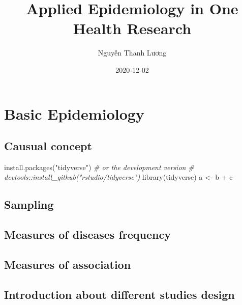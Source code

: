\documentclass[
]{article}
\title{Applied Epidemiology in One Health Research}
\author{Nguyễn Thanh Lương}
\date{2020-12-02}
\newenvironment{Shaded}{\begin{snugshade}}{\end{snugshade}}
\newcommand{\CommentTok}[1]{\textcolor[rgb]{0.56,0.35,0.01}{\textit{#1}}}
\newcommand{\FunctionTok}[1]{\textcolor[rgb]{0.00,0.00,0.00}{#1}}
\newcommand{\NormalTok}[1]{#1}
\newcommand{\OtherTok}[1]{\textcolor[rgb]{0.56,0.35,0.01}{#1}}
\newcommand{\SpecialCharTok}[1]{\textcolor[rgb]{0.00,0.00,0.00}{#1}}
\newcommand{\StringTok}[1]{\textcolor[rgb]{0.31,0.60,0.02}{#1}}
\begin{document}
\maketitle

{
\setcounter{tocdepth}{2}
\tableofcontents
}
\hypertarget{basic-epidemiology}{%
\section{Basic Epidemiology}\label{basic-epidemiology}}

\hypertarget{causual-concept}{%
\subsection{Causual concept}\label{causual-concept}}

\begin{Shaded}
\begin{Highlighting}[]
\FunctionTok{install.packages}\NormalTok{(}\StringTok{"tidyverse"}\NormalTok{)}
\CommentTok{\# or the development version}
\CommentTok{\# devtools::install\_github("rstudio/tidyverse")}
\FunctionTok{library}\NormalTok{(tidyverse)}
\NormalTok{a }\OtherTok{\textless{}{-}}\NormalTok{ b }\SpecialCharTok{+}\NormalTok{ c}
\end{Highlighting}
\end{Shaded}

\hypertarget{sampling}{%
\subsection{Sampling}\label{sampling}}

\hypertarget{measures-of-diseases-frequency}{%
\subsection{Measures of diseases frequency}\label{measures-of-diseases-frequency}}

\hypertarget{measures-of-association}{%
\subsection{Measures of association}\label{measures-of-association}}

\hypertarget{introduction-about-different-studies-design}{%
\subsection{Introduction about different studies design}\label{introduction-about-different-studies-design}}
\end{document}
